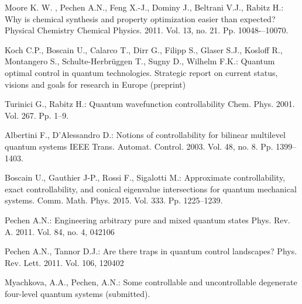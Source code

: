 \documentclass[12pt]{llncs}
\begin{document}
\begin{thebibliography}{9}

Moore K. W. , Pechen A.N., Feng X.-J., Dominy J., Beltrani V.J., Rabitz H.:
Why is chemical synthesis and property optimization easier than expected? Physical Chemistry Chemical Physics. 2011. Vol. 13, no. 21. Pp. 10048-–10070.

Koch C.P., Boscain U., Calarco T., Dirr G., Filipp S., Glaser S.J., Kosloff R., Montangero S., Schulte-Herbr\"{u}ggen T.,  Sugny D., Wilhelm F.K.:
Quantum optimal control in quantum technologies. Strategic report on current status, visions and goals for research in Europe
(preprint)

Turinici G., Rabitz H.:
Quantum wavefunction controllability
Chem. Phys. 2001. Vol. 267. Pp. 1--9.

Albertini F., D'Alessandro D.:
Notions of controllability for bilinear multilevel quantum systems
IEEE Trans. Automat. Control. 2003. Vol. 48, no. 8. Pp. 1399--1403.

Boscain U., Gauthier J-P., Rossi F., Sigalotti M.:
Approximate controllability, exact controllability, and conical eigenvalue intersections for quantum mechanical systems. 
Comm. Math. Phys. 2015. Vol. 333. Pp. 1225--1239.

Pechen A.N.:
Engineering arbitrary pure and mixed quantum states
Phys. Rev. A. 2011. Vol.  84,  no. 4, 042106

Pechen A.N., Tannor D.J.:
Are there traps in quantum control landscapes?
Phys. Rev. Lett. 2011. Vol. 106, 120402 

 Myachkova, A.A., Pechen, A.N.: 
Some controllable and uncontrollable degenerate four-level quantum systems (submitted). 

\end{thebibliography}
\end{document}
